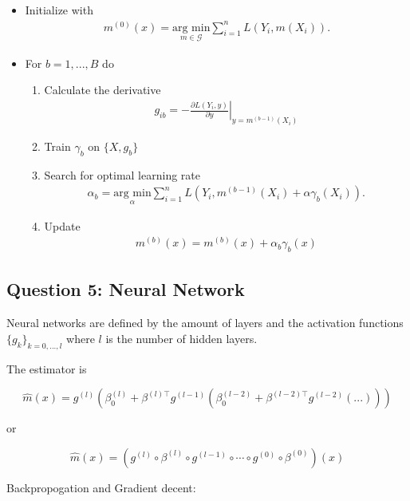 \documentclass[
]{book}
\providecommand{\tightlist}{%
  \setlength{\itemsep}{0pt}\setlength{\parskip}{0pt}}
\begin{document}
\begin{itemize}
\tightlist
\item
  Initialize with
  \begin{align*}
    m^{(0)}(x)=\underset{m\in \mathcal G}{\text{arg min}}\sum_{i=1}^n L(Y_i,m(X_i)).
    \end{align*}
\item
  For \(b= 1,..., B\) do

  \begin{enumerate}
  \def\labelenumi{(\alph{enumi})}
  \tightlist
  \item
    Calculate the derivative
    \begin{align*}
    g_{ib}=-\left.\frac{\partial L(Y_i,y)}{\partial y}\right\vert_{y=m^{(b-1)}(X_i)}
    \end{align*}
  \item
    Train \(\gamma_b\) on \(\{X,g_b\}\)
  \item
    Search for optimal learning rate
    \begin{align*}
    \alpha_b=\underset{\alpha}{\text{arg min}}\sum_{i=1}^n L(Y_i,m^{(b-1)}(X_i) +\alpha\gamma_b(X_i)).
    \end{align*}
  \item
    Update
    \begin{align*}
    m^{(b)}(x)=m^{(b)}(x) + \alpha_b\gamma_b(x)
    \end{align*}
  \end{enumerate}
\end{itemize}

\hypertarget{question-5-neural-network}{%
\subsection{Question 5: Neural Network}\label{question-5-neural-network}}

Neural networks are defined by the amount of layers and the activation functions \(\{g_k\}_{k=0,...,l}\) where \(l\) is the number of hidden layers.

The estimator is

\[
\hat m(x)=g^{(l)}\left(\beta^{(l)}_0+\beta^{(l)\top}g^{(l-1)}\left(\beta^{(l-2)}_0+\beta^{(l-2)\top}g^{(l-2)}\left(...\right)\right) \right)
\]

or

\[
\hat m (x)=\left(g^{(l)}\circ \beta^{(l)}\circ g^{(l-1)}\circ \cdots \circ g^{(0)} \circ\beta^{(0)}\right)(x)
\]

Backpropogation and Gradient decent:
\end{document}
